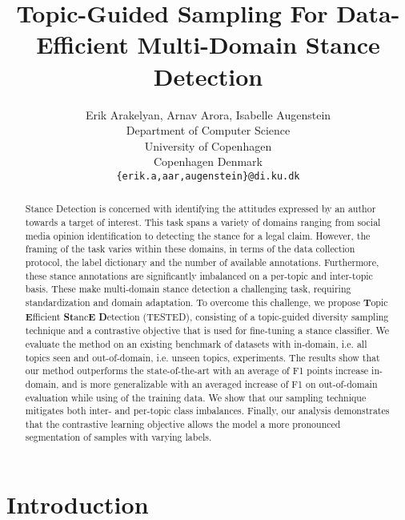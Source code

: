 \documentclass[11pt]{article}
\title{Topic-Guided Sampling For Data-Efficient Multi-Domain Stance Detection}
\author{Erik Arakelyan, Arnav Arora, Isabelle Augenstein \\
Department of Computer Science\\
University of Copenhagen \\
Copenhagen Denmark  \\ 
\texttt{\{erik.a,aar,augenstein\}@di.ku.dk} 
}
\begin{document}
\maketitle
\begin{abstract}

Stance Detection is concerned with identifying the attitudes expressed by an author towards a target of interest. This task spans a variety of domains ranging from social media opinion identification to detecting the stance for a legal claim. However, the framing of the task varies within these domains, in terms of the data collection protocol, the label dictionary and the number of available annotations. Furthermore, these stance annotations are significantly imbalanced on a per-topic and inter-topic basis. These make multi-domain stance detection a challenging task, requiring standardization and domain adaptation. To overcome this challenge, we propose \textbf{T}opic \textbf{E}fficient \textbf{St}anc\textbf{E} \textbf{D}etection	(TESTED), consisting of a topic-guided diversity sampling technique and a contrastive objective that is used for fine-tuning a stance classifier. We evaluate the method on an existing benchmark of  datasets with in-domain, i.e. all topics seen and out-of-domain, i.e. unseen topics, experiments. The results show that our method outperforms the state-of-the-art with an average of  F1 points increase in-domain, and is more generalizable with an averaged increase of  F1 on out-of-domain evaluation while using  of the training data. We show that our sampling technique  mitigates both inter- and per-topic class imbalances. Finally, our analysis demonstrates that the contrastive learning objective allows the model a more pronounced segmentation of samples with varying labels.






\end{abstract}

\section{Introduction}
\label{sec:intro}
\end{document}
